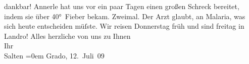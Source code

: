 \begin{ledgroupsized}[t]{13cm}
               dankbar! \pend
           \pstart
           Annerle hat uns vor ein paar Tagen einen
               großen Schreck bereitet, indem sie über 40° Fieber bekam. Zweimal. Der Arzt glaubt, an Malaria, was
               sich heute entscheiden müſste. \pend
           \pstart
           Wir reisen Donnerstag früh und sind freitag in Landro!\pend
           \pstart
           Alles herzliche von uns zu Ihnen {\\[\baselineskip]}Ihr {\\[\baselineskip]}\spacefill\mbox{Salten}\pend
           \leftskip=0em{}\pstart
           Grado, 12. Juli 09\pend
           
         
         \endnumbering{}\end{ledgroupsized}\begin{anhang}\end{anhang}\newcommand{\dateiname}{L03502}\newcommand{\titel}{Felix Salten an Arthur Schnitzler, 12. 7. 1909}\newcommand{\editorInnen}{Martin Anton Müller und Laura Untner}
      